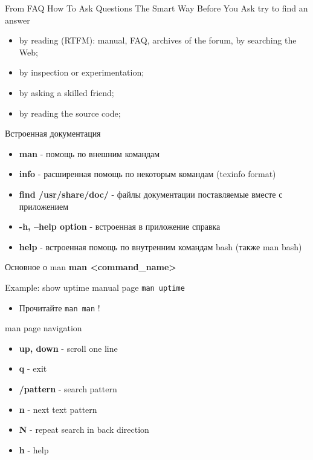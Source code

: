 \begin{frame}[fragile]{From FAQ How To Ask Questions The Smart Way}
Before You Ask try to find an answer
  \begin{itemize}
	  \item by reading (RTFM): manual, FAQ, archives of the forum, by searching the Web;
	  \item by inspection or experimentation;
	  \item by asking a skilled friend;
	  \item by reading the source code;
    \end{itemize}
\end{frame}


\begin{frame}[fragile]{Встроенная документация}
\begin{itemize}
    \item \textbf{man} - помощь по внешним командам
    \pause
    \item \textbf{info} - расширенная помощь по некоторым командам (texinfo format)
    \pause
    \item \textbf{find /usr/share/doc/} - файлы документации поставляемые вместе с приложением
    \item \textbf{-h, --help option} - встроенная в приложение справка
    \item \textbf{help} - встроенная помощь по внутренним командам bash (также man bash)
\end{itemize}
\end{frame}

\begin{frame}[fragile]{Основное о man}
      \textbf{man \textless command\_name\textgreater }

	\begin{block}{Example: show uptime manual page}
		{\tt man uptime}
	\end{block}

		\begin{itemize}
			\item Прочитайте {\tt man man} !
		\end{itemize}

\end{frame}

\begin{frame}[fragile]{man page navigation}
		\begin{itemize}
			\item \textbf{up, down} - scroll one line
			\item \textbf{q} - exit
			\item \textbf{/pattern} - search pattern
			\item \textbf{n} - next text pattern
			\item \textbf{N} - repeat search in back direction
			\item \textbf{h} - help
		\end{itemize}
\end{frame}

